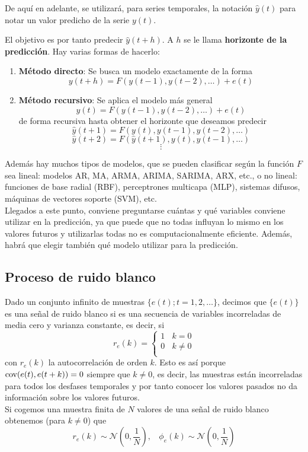 \begin{nota}
De aquí en adelante, se utilizará, para series temporales, la notación $\widehat{y}(t)$ para notar un valor predicho de la serie $y(t)$.
\end{nota}

El objetivo es por tanto predecir $\widehat{y}(t+h)$. A $h$ se le llama \textbf{horizonte de la predicción}. Hay varias formas de hacerlo:
\begin{enumerate}
\item \textbf{Método directo}: Se busca un modelo exactamente de la forma
\[	y(t+h) = F(y(t-1), y(t-2),\dots) + e(t)	\]
\item \textbf{Método recursivo}: Se aplica el modelo más general
\[	y(t) = F(y(t-1), y(t-2),\dots)+e(t)	\]
de forma recursiva hasta obtener el horizonte que deseamos predecir
\[	\widehat{y}(t+1) = F(y(t), y(t-1), y(t-2),\dots)	\]
\[	\widehat{y}(t+2) = F(\widehat{y}(t+1),y(t),y(t-1),\dots)	\]
\[ \vdots	\]
\end{enumerate}

Además hay muchos tipos de modelos, que se pueden clasificar según la función $F$ sea lineal: modelos AR, MA, ARMA, ARIMA, SARIMA, ARX, etc., o no lineal: funciones de base radial (RBF), perceptrones multicapa (MLP), sistemas difusos, máquinas de vectores soporte (SVM), etc.\\

Llegados a este punto, conviene preguntarse cuántas y qué variables conviene utilizar en la predicción, ya que puede que no todas influyan lo mismo en los valores futuros y utilizarlas todas no es computacionalmente eficiente. Además, habrá que elegir también qué modelo utilizar para la predicción.\\

\subsection{Proceso de ruido blanco}

Dado un conjunto infinito de muestras $\{e(t); t=1,2,\dots\}$, decimos que $\{e(t)\}$ es una señal de ruido blanco si es una secuencia de variables incorreladas de media cero y varianza constante, es decir, si
\begin{equation*}
	r_e(k) = 
  \left\lbrace
  \begin{array}{l}
     1 \ \ \ \ k = 0 \\
     0 \ \ \ \ k \neq 0 \\
  \end{array}
  \right.
\end{equation*}
con $r_e(k)$ la autocorrelación de orden $k$. Esto es así porque $\text{cov}{(e(t),e(t+k))} = 0$ siempre que $k \neq 0$, es decir, las muestras están incorreladas para todos los desfases temporales y por tanto conocer los valores pasados no da información sobre los valores futuros.\\
Si cogemos una muestra finita de $N$ valores de una señal de ruido blanco obtenemos (para $k \neq 0$) que
\[	r_e(k) \sim \mathcal{N} \left( 0, \frac{1}{N} \right), \ \ \ \ \phi_e(k) \sim \mathcal{N} \left( 0, \frac{1}{N} \right)	\]

